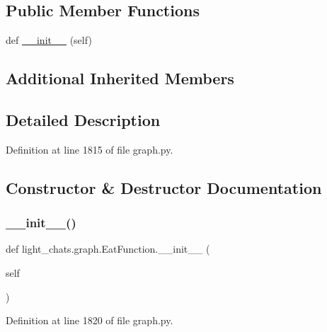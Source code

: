 \subsection*{Public Member Functions}
\begin{DoxyCompactItemize}
\item 
def \hyperlink{classlight__chats_1_1graph_1_1EatFunction_a78b5e03c987945ebced34fe2454613ba}{\+\_\+\+\_\+init\+\_\+\+\_\+} (self)
\end{DoxyCompactItemize}
\subsection*{Additional Inherited Members}


\subsection{Detailed Description}
\begin{DoxyVerb}
\end{DoxyVerb}
 

Definition at line 1815 of file graph.\+py.



\subsection{Constructor \& Destructor Documentation}
\mbox{\label{classlight__chats_1_1graph_1_1EatFunction_a78b5e03c987945ebced34fe2454613ba}} 
\subsubsection{\texorpdfstring{\+\_\+\+\_\+init\+\_\+\+\_\+()}{\_\_init\_\_()}}
{\footnotesize\ttfamily def light\+\_\+chats.\+graph.\+Eat\+Function.\+\_\+\+\_\+init\+\_\+\+\_\+ (\begin{DoxyParamCaption}\item[{}]{self }\end{DoxyParamCaption})}



Definition at line 1820 of file graph.\+py.


